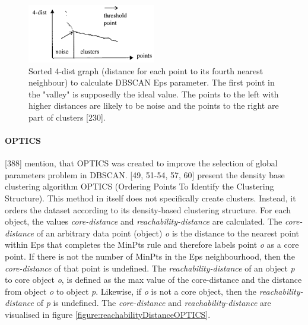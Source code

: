 \begin{figure}[h]
  \centering
  \includegraphics[width=0.5\textwidth]{./images/sortedKGraphDBSCAN.png}
  \caption{Sorted 4-dist graph (distance for each point to its fourth nearest neighbour) to calculate DBSCAN Eps parameter. The first point in the "valley" is supposedly the ideal value. The points to the left with higher distances are likely to be noise and the points to the right are part of clusters \autocite{DBSCAN}[230].}
  \label{figure:sortedKGraphDBSCAN}
\end{figure}




\paragraph{OPTICS}
\label{section:OPTICS}
\textcite{han2011data}[388] mention, that OPTICS was created to improve the selection of global parameters problem in DBSCAN.
\textcite{OPTICS}[49, 51-54, 57, 60] present the density base clustering algorithm OPTICS (Ordering Points To Identify the Clustering Structure). This method in itself does not specifically create clusters. Instead, it orders the dataset according to its density-based clustering structure. For each object, the values \textit{core-distance} and \textit{reachability-distance} are calculated. The \textit{core-distance} of an arbitrary data point (object) \textit{o} is the distance to the nearest point within Eps that completes the MinPts rule and therefore labels point \textit{o} as a core point. If there is not the number of MinPts in the Eps neighbourhood, then the \textit{core-distance} of that point is undefined. The \textit{reachability-distance} of an object \textit{p} to core object \textit{o}, is defined as the max value of the core-distance and the distance from object \textit{o} to object \textit{p}. Likewise, if \textit{o} is not a core object, then the \textit{reachability-distance} of \textit{p} is undefined. The \textit{core-distance} and \textit{reachability-distance} are visualised in figure \ref{figure:reachabilityDistanceOPTICS}.

